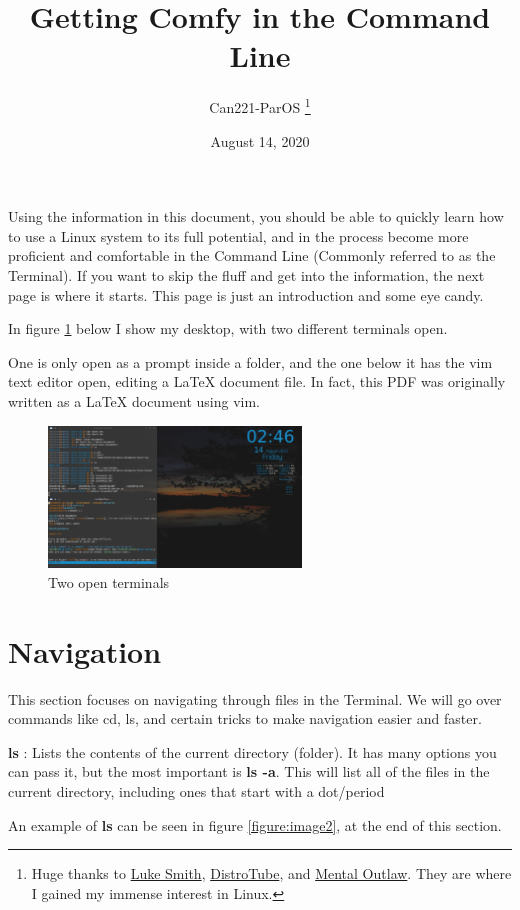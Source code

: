 \documentclass[12pt, letterpaper, twoside]{article}
\title{Getting Comfy in the Command Line}
\author{Can221-ParOS \thanks{Huge thanks to \href{https://www.youtube.com/channel/UC2eYFnH61tmytImy1mTYvhA}{Luke Smith}, \href{https://www.youtube.com/channel/UCVls1GmFKf6WlTraIb_IaJg}{DistroTube}, and \href{https://www.youtube.com/channel/UC7YOGHUfC1Tb6E4pudI9STA}{Mental Outlaw}. They are where I gained my immense interest in Linux.}}
\date{August 14, 2020}
\begin{document}
\maketitle


Using the information in this document, you should be able to quickly learn how to use a Linux system to its full potential, and in the process become more proficient and comfortable in the Command Line (Commonly referred to as the Terminal). If you want to skip the fluff and get into the information, the next page is where it starts. This page is just an introduction and some eye candy. 


In figure \ref{figure:image1} below I show my desktop, with two different terminals open. 

One is only open as a prompt inside a folder, and the one below it has the vim text editor open, editing a \LaTeX{} document file. 
In fact, this PDF was originally written as a \LaTeX{} document using vim.


\begin{figure} [ht]
        \centering
	\includegraphics[width=0.60\textwidth]{screen}
	\caption{Two open terminals}
	\label{figure:image1}
\end{figure}

\section{Navigation}


This section focuses on navigating through files in the Terminal. We will go over commands like cd, ls, and certain tricks to make navigation easier and faster.

\textbf{ls} : Lists the contents of the current directory (folder). It has many options you can pass it, but the most important is \textbf{ls -a}. This will list all of the files in the current directory, including ones that start with a dot/period

An example of \textbf{ls} can be seen in figure \ref{figure:image2}, at the end of this section.
\end{document}

